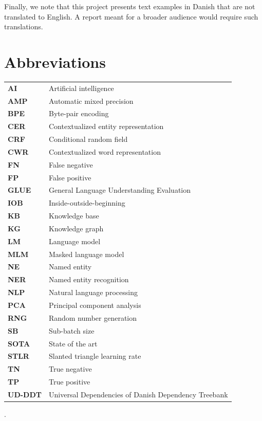 \documentclass[12pt, fleqn]{report}
\newcommand{\abbrv}[2]{\vspace{0.1cm}\textbf{#1} & #2\\}
\begin{document}
Finally, we note that this project presents text examples in Danish that are not translated to English.
A report meant for a broader audience would require such translations.

\chapter*{Abbreviations}
\begin{table}[H]
    \begin{tabular}{@{}l l}
        \abbrv{AI}{Artificial intelligence}
        \abbrv{AMP}{Automatic mixed precision}
        \abbrv{BPE}{Byte-pair encoding}
        \abbrv{CER}{Contextualized entity representation}
        \abbrv{CRF}{Conditional random field}
        \abbrv{CWR}{Contextualized word representation}
        \abbrv{FN}{False negative}
        \abbrv{FP}{False positive}
        \abbrv{GLUE}{General Language Understanding Evaluation}
        \abbrv{IOB}{Inside-outside-beginning}
        \abbrv{KB}{Knowledge base}
        \abbrv{KG}{Knowledge graph}
        \abbrv{LM}{Language model}
        \abbrv{MLM}{Masked language model}
        \abbrv{NE}{Named entity}
        \abbrv{NER}{Named entity recognition}
        \abbrv{NLP}{Natural language processing}
        \abbrv{PCA}{Principal component analysis}
        \abbrv{RNG}{Random number generation}
        \abbrv{SB}{Sub-batch size}
        \abbrv{SOTA}{State of the art}
        \abbrv{STLR}{Slanted triangle learning rate}
        \abbrv{TN}{True negative}
        \abbrv{TP}{True positive}
        \abbrv{UD-DDT}{Universal Dependencies of Danish Dependency Treebank}
    \end{tabular}
\end{table}\noindent

\tableofcontents

\setlength{\headheight}{15pt}
\addtolength{\topmargin}{-2.5pt}.















\renewcommand*{\bibfont}{\normalfont\footnotesize}
\printbibliography[heading=bibintoc]

\appendix

\end{document}
